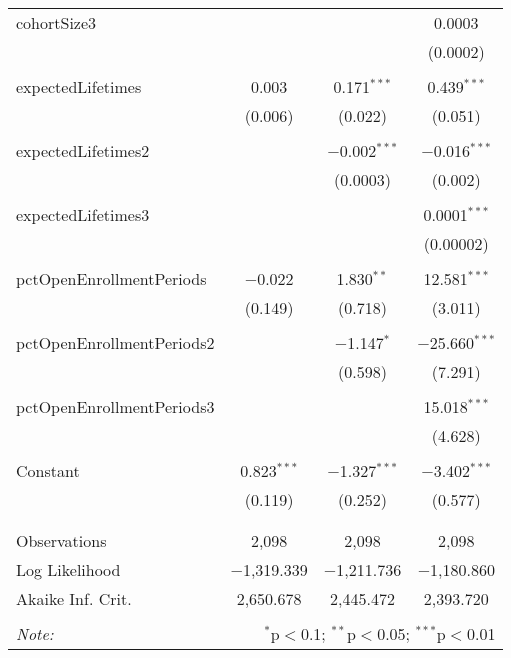 \begin{table}[!htbp]
\begin{tabular}{@{\extracolsep{5pt}}lccc}
 cohortSize3 &  &  & 0.0003 \\ 
  &  &  & (0.0002) \\ 
  & & & \\ 
 expectedLifetimes & 0.003 & 0.171$^{***}$ & 0.439$^{***}$ \\ 
  & (0.006) & (0.022) & (0.051) \\ 
  & & & \\ 
 expectedLifetimes2 &  & $-$0.002$^{***}$ & $-$0.016$^{***}$ \\ 
  &  & (0.0003) & (0.002) \\ 
  & & & \\ 
 expectedLifetimes3 &  &  & 0.0001$^{***}$ \\ 
  &  &  & (0.00002) \\ 
  & & & \\ 
 pctOpenEnrollmentPeriods & $-$0.022 & 1.830$^{**}$ & 12.581$^{***}$ \\ 
  & (0.149) & (0.718) & (3.011) \\ 
  & & & \\ 
 pctOpenEnrollmentPeriods2 &  & $-$1.147$^{*}$ & $-$25.660$^{***}$ \\ 
  &  & (0.598) & (7.291) \\ 
  & & & \\ 
 pctOpenEnrollmentPeriods3 &  &  & 15.018$^{***}$ \\ 
  &  &  & (4.628) \\ 
  & & & \\ 
 Constant & 0.823$^{***}$ & $-$1.327$^{***}$ & $-$3.402$^{***}$ \\ 
  & (0.119) & (0.252) & (0.577) \\ 
  & & & \\ 
\hline \\[-1.8ex] 
Observations & 2,098 & 2,098 & 2,098 \\ 
Log Likelihood & $-$1,319.339 & $-$1,211.736 & $-$1,180.860 \\ 
Akaike Inf. Crit. & 2,650.678 & 2,445.472 & 2,393.720 \\ 
\hline 
\hline \\[-1.8ex] 
\textit{Note:}  & \multicolumn{3}{r}{$^{*}$p$<$0.1; $^{**}$p$<$0.05; $^{***}$p$<$0.01} \\ 
\end{tabular} 
\end{table}  
